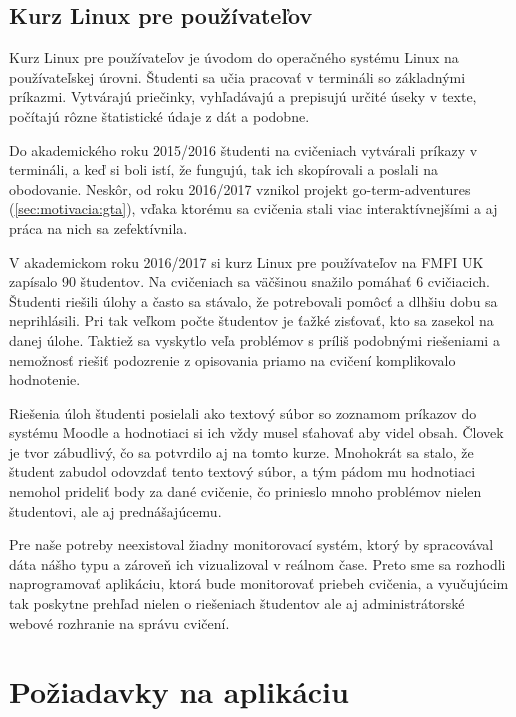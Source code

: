 \subsection{Kurz Linux pre používateľov}
\label{sec:motivacia:linuxforusers}

Kurz Linux pre používateľov je úvodom do operačného systému Linux
na používateľskej úrovni. Študenti sa učia pracovať v termináli so základnými
príkazmi. Vytvárajú priečinky, vyhľadávajú a prepisujú určité úseky v texte,
počítajú rôzne štatistické údaje z dát a podobne.

Do akademického roku 2015/2016 študenti na cvičeniach vytvárali príkazy v
termináli, a keď si boli istí, že fungujú, tak ich skopírovali a poslali na obodovanie.
Neskôr, od roku 2016/2017 vznikol projekt go-term-adventures (\ref{sec:motivacia:gta}), vďaka ktorému sa
cvičenia stali viac interaktívnejšími a aj práca na nich sa zefektívnila.

V akademickom roku 2016/2017 si kurz Linux pre používateľov na FMFI UK zapísalo
90 študentov. Na cvičeniach sa väčšinou snažilo pomáhať 6 cvičiacich. Študenti riešili
úlohy a často sa stávalo, že potrebovali pomôcť a dlhšiu dobu sa neprihlásili.
Pri tak veľkom počte študentov je ťažké zisťovať, kto sa zasekol na danej úlohe.
Taktiež sa vyskytlo veľa problémov s príliš podobnými riešeniami a nemožnosť riešiť podozrenie z opisovania priamo na cvičení komplikovalo hodnotenie.

Riešenia úloh študenti posielali ako textový súbor so zoznamom príkazov do systému
Moodle a hodnotiaci si ich vždy musel sťahovať aby videl obsah. Človek je
tvor zábudlivý, čo sa potvrdilo aj na tomto kurze. Mnohokrát sa stalo, že študent
zabudol odovzdať tento textový súbor, a tým pádom mu hodnotiaci nemohol prideliť
body za dané cvičenie, čo prinieslo mnoho problémov nielen študentovi, ale aj
prednášajúcemu.

Pre naše potreby neexistoval žiadny monitorovací systém, ktorý by spracovával
dáta nášho typu a zároveň ich vizualizoval v reálnom čase. 
Preto sme sa rozhodli naprogramovať aplikáciu, ktorá bude
monitorovať priebeh cvičenia, a vyučujúcim tak poskytne prehľad nielen o riešeniach
študentov ale aj administrátorské webové rozhranie na správu cvičení.

\section{Požiadavky na aplikáciu}
\label{sec:apprequirements}

